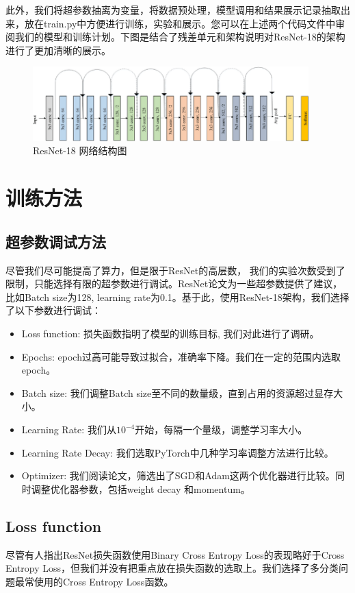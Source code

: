 \documentclass{article}
\theoremstyle{definition}
\begin{document}
\indent
此外，我们将超参数抽离为变量，将数据预处理，模型调用和结果展示记录抽取出来，放在train.py中方便进行训练，实验和展示。您可以在上述两个代码文件中审阅我们的模型和训练计划。下图是结合了残差单元和架构说明对ResNet-18的架构进行了更加清晰的展示。
\begin{figure}[h] %
	\centering %
	\includegraphics[width=0.95\textwidth]{resnet18.png} %
	\caption{ResNet-18 网络结构图} %
	\label{Fig.resnet3} %
\end{figure}


\section{训练方法}
\subsection{超参数调试方法}
尽管我们尽可能提高了算力，但是限于ResNet的高层数， 我们的实验次数受到了限制，只能选择有限的超参数进行调试。ResNet论文\cite{he2015deep}为一些超参数提供了建议，比如Batch size为128, learning rate为0.1。基于此，使用ResNet-18架构，我们选择了以下参数进行调试：
\begin{itemize}
	\item Loss function: 损失函数指明了模型的训练目标, 我们对此进行了调研。
	\item Epochs: epoch过高可能导致过拟合，准确率下降。我们在一定的范围内选取epoch。
	\item Batch size: 我们调整Batch size至不同的数量级，直到占用的资源超过显存大小。
	\item Learning Rate: 我们从$10 ^ {-4}$开始，每隔一个量级，调整学习率大小。
	\item Learning Rate Decay: 我们选取PyTorch中几种学习率调整方法进行比较。
	\item Optimizer: 我们阅读论文，筛选出了SGD和Adam这两个优化器进行比较。\cite{keskar2017improving}同时调整优化器参数，包括weight decay 和momentum。
\end{itemize}

\subsection {Loss function}
尽管有人指出ResNet损失函数使用Binary Cross Entropy Loss的表现略好于Cross Entropy Loss\cite{beyer2020imagenet}，但我们并没有把重点放在损失函数的选取上。我们选择了多分类问题最常使用的Cross Entropy Loss函数。
\end{document}
